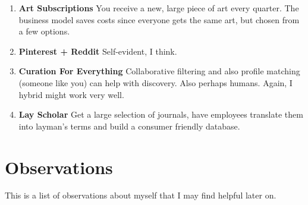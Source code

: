 \documentclass[paper=a4, fontsize=11pt]{scrartcl} %
\numberwithin{equation}{section} %
\numberwithin{figure}{section} %
\numberwithin{table}{section} %
\begin{document}
\begin{enumerate}
\item \textbf{Art Subscriptions} You receive a new, large piece of art every quarter.  The business model saves costs since everyone gets the same art, but chosen from a few options. 

\item \textbf{Pinterest + Reddit} Self-evident, I think.

\item \textbf{Curation For Everything} Collaborative filtering and also profile matching (someone like you) can help with discovery.  Also perhaps humans.  Again, I hybrid might work very well.  

\item \textbf{Lay Scholar} Get a large selection of journals, have employees translate them into layman's terms and build a consumer friendly database.  


\end{enumerate}




\section{Observations}

This is a list of observations about myself that I may find helpful later on.
 
\end{document}
